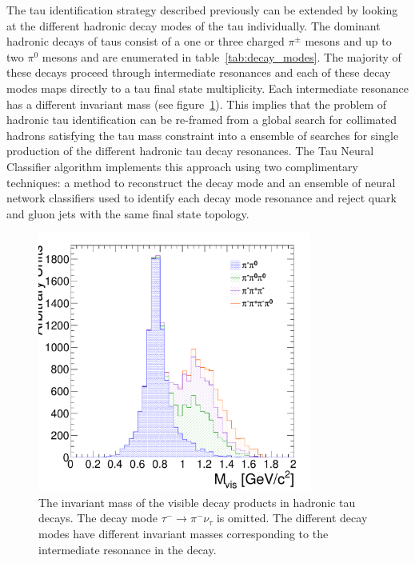 The tau identification strategy described previously can be extended by
looking at the different hadronic decay modes of the tau individually.
The dominant hadronic decays of taus consist of a one or three charged
$\pi^{\pm}$ mesons and up to two $\pi^0$ mesons and are enumerated in
table~\ref{tab:decay_modes}.  The majority of these decays proceed through
intermediate resonances and each of these decay modes maps directly to a tau
final state multiplicity. Each intermediate resonance has a different invariant
mass (see figure~\ref{fig:trueInvMass}).  This implies that the problem of
hadronic tau identification can be re-framed from a global search for
collimated hadrons satisfying the tau mass constraint into a ensemble of
searches for single production of the different hadronic tau decay resonances.
The Tau Neural Classifier algorithm implements this approach using two
complimentary techniques: a method to reconstruct the decay mode and an
ensemble of neural network classifiers used to identify each decay mode
resonance and reject quark and gluon jets with the same final state topology.

\begin{figure}[thbp]
   \begin{center}
     \includegraphics[width=90mm]{tanc_chapter/figures/truthIMvsDM.pdf}
   \end{center}
   \caption[Visible invariant mass of $\tau$ lepton decay products]{The
   invariant mass of the visible decay products in hadronic tau decays.  The
   decay mode $\tau^{-} \to \pi^{-} \nu_\tau$ is omitted.  The different decay
   modes have different invariant masses corresponding to the intermediate
   resonance in the decay.} \label{fig:trueInvMass}
\end{figure}

